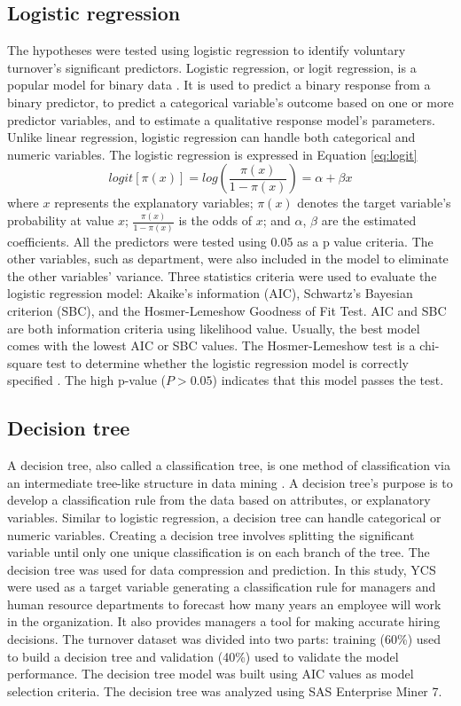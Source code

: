 \subsection{Logistic regression}
The hypotheses were tested using logistic regression to identify voluntary turnover’s significant predictors. Logistic regression, or logit regression, is a popular model for binary data \citep{RN57}. It is used to predict a binary response from a binary predictor, to predict a categorical variable’s outcome based on one or more predictor variables, and to estimate a qualitative response model’s parameters. Unlike linear regression, logistic regression can handle both categorical and numeric variables. The logistic regression is expressed in Equation \ref{eq:logit}
\begin{equation}
logit[\pi(x)]=log(\frac{\pi(x)} {1-\pi(x)})= \alpha+\beta x  
\label{eq:logit}            
\end{equation}
where $x$ represents the explanatory variables; $\pi(x)$ denotes the target variable’s probability at value $x$; $\frac{\pi(x)} {1-\pi(x)}$ is the odds of $x$; and $\alpha$, $\beta$ are the estimated coefficients. All the predictors were tested using 0.05 as a p value criteria. The other variables, such as department, were also included in the model to eliminate the other variables’ variance. Three statistics criteria were used to evaluate the logistic regression model: Akaike’s information (AIC), Schwartz’s Bayesian criterion (SBC), and the Hosmer-Lemeshow Goodness of Fit Test. AIC and SBC are both information criteria using likelihood value. Usually, the best model comes with the lowest AIC or SBC values. The Hosmer-Lemeshow test is a chi-square test to determine whether the logistic regression model is correctly specified \citep{hosmer2004}. The high p-value ($P>0.05$) indicates that this model passes the test. 
\subsection{Decision tree}
A decision tree, also called a classification tree, is one method of classification via an intermediate tree-like structure in data mining \citep{hand2001}. A decision tree’s purpose is to develop a classification rule from the data based on attributes, or explanatory variables. Similar to logistic regression, a decision tree can handle categorical or numeric variables. Creating a decision tree involves splitting the significant variable until only one unique classification is on each branch of the tree. The decision tree was used for data compression and prediction. 
In this study, YCS were used as a target variable generating a classification rule for managers and human resource departments to forecast how many years an employee will work in the organization. It also provides managers a tool for making accurate hiring decisions. The turnover dataset was divided into two parts: training (60\%) used to build a decision tree and validation (40\%) used to validate the model performance. The decision tree model was built using AIC values as model selection criteria. The decision tree was analyzed using SAS Enterprise Miner 7. 
